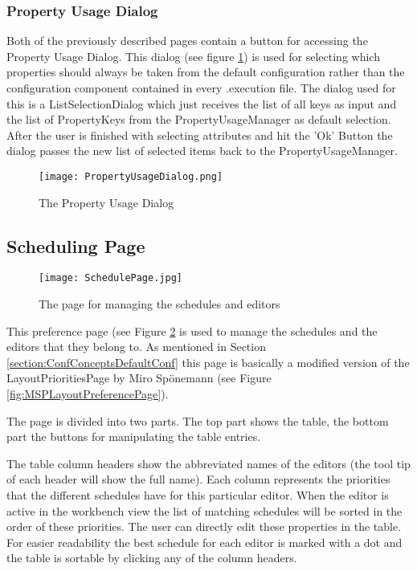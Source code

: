 \subsubsection{Property Usage Dialog}
Both of the previously described pages contain a button for accessing the Property Usage Dialog.
This dialog (see figure \ref{fig:PropertyUsageDialog}) is used for selecting which properties should always be taken
from the default configuration rather than the configuration component contained in every .execution file.
The dialog used for this is a ListSelectionDialog which just receives the list of
all keys as input and the list of PropertyKeys from the PropertyUsageManager as default selection.
After the user is finished with selecting attributes and hit the 'Ok' Button the dialog
passes the new list of selected items back to the PropertyUsageManager.
\begin{figure}[PropertyUsageDialog]
  \centering
  \texttt{[image: PropertyUsageDialog.png]}
  \caption[Property Usage Dialog]%
  {The Property Usage Dialog\protect}
  \label{fig:PropertyUsageDialog}
\end{figure}

\subsection{Scheduling Page}
\label{section:SchedulingPage}
\begin{figure}[Scheduling Page]
  \centering
  \texttt{[image: SchedulePage.jpg]}
  \caption[The page for managing the schedules and editors]%
  {The page for managing the schedules and editors\protect}
  \label{fig:SchedulePage}
\end{figure}
This preference page (see Figure \ref{fig:SchedulePage} is used to manage the schedules and the editors that they belong to.
As mentioned in Section \ref{section:ConfConceptsDefaultConf} this page is basically a modified version 
of the LayoutPrioritiesPage by Miro Sp\"onemann (see Figure \ref{fig:MSPLayoutPreferencePage}).

The page is divided into two parts. The top part shows the table, the bottom part the buttons for manipulating
the table entries.

The table column headers show the abbreviated names of the editors (the tool tip of each header will show the full name). 
Each column represents the priorities that the different schedules have for this particular editor. When the editor is
active in the workbench view the list of matching schedules will be sorted in the order of these priorities. The user
can directly edit these properties in the table. For easier readability the best schedule for each editor is marked
with a dot and the table is sortable by clicking any of the column headers.

